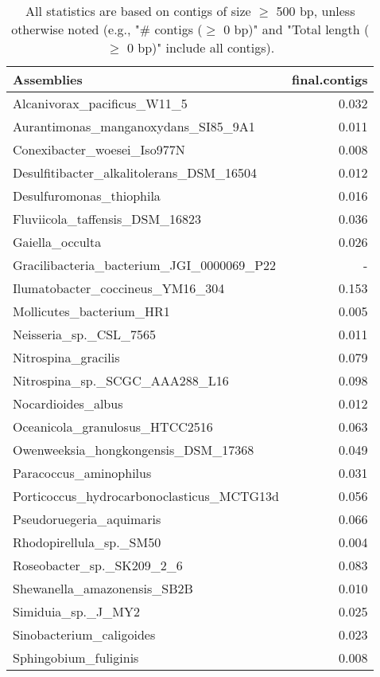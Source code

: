 \documentclass[12pt,a4paper]{article}
\begin{document}
\begin{table}[ht]
\begin{center}
\caption{All statistics are based on contigs of size $\geq$ 500 bp, unless otherwise noted (e.g., "\# contigs ($\geq$ 0 bp)" and "Total length ($\geq$ 0 bp)" include all contigs).}
\begin{tabular}{|l*{1}{|r}|}
\hline
Assemblies & final.contigs \\ \hline
Alcanivorax\_pacificus\_W11\_5 & 0.032 \\ \hline
Aurantimonas\_manganoxydans\_SI85\_9A1 & 0.011 \\ \hline
Conexibacter\_woesei\_Iso977N & 0.008 \\ \hline
Desulfitibacter\_alkalitolerans\_DSM\_16504 & 0.012 \\ \hline
Desulfuromonas\_thiophila & 0.016 \\ \hline
Fluviicola\_taffensis\_DSM\_16823 & 0.036 \\ \hline
Gaiella\_occulta & 0.026 \\ \hline
Gracilibacteria\_bacterium\_JGI\_0000069\_P22 & - \\ \hline
Ilumatobacter\_coccineus\_YM16\_304 & 0.153 \\ \hline
Mollicutes\_bacterium\_HR1 & 0.005 \\ \hline
Neisseria\_sp.\_CSL\_7565 & 0.011 \\ \hline
Nitrospina\_gracilis & 0.079 \\ \hline
Nitrospina\_sp.\_SCGC\_AAA288\_L16 & 0.098 \\ \hline
Nocardioides\_albus & 0.012 \\ \hline
Oceanicola\_granulosus\_HTCC2516 & 0.063 \\ \hline
Owenweeksia\_hongkongensis\_DSM\_17368 & 0.049 \\ \hline
Paracoccus\_aminophilus & 0.031 \\ \hline
Porticoccus\_hydrocarbonoclasticus\_MCTG13d & 0.056 \\ \hline
Pseudoruegeria\_aquimaris & 0.066 \\ \hline
Rhodopirellula\_sp.\_SM50 & 0.004 \\ \hline
Roseobacter\_sp.\_SK209\_2\_6 & 0.083 \\ \hline
Shewanella\_amazonensis\_SB2B & 0.010 \\ \hline
Simiduia\_sp.\_J\_MY2 & 0.025 \\ \hline
Sinobacterium\_caligoides & 0.023 \\ \hline
Sphingobium\_fuliginis & 0.008 \\ \hline

\end{tabular}
\end{center}
\end{table}
\end{document}
